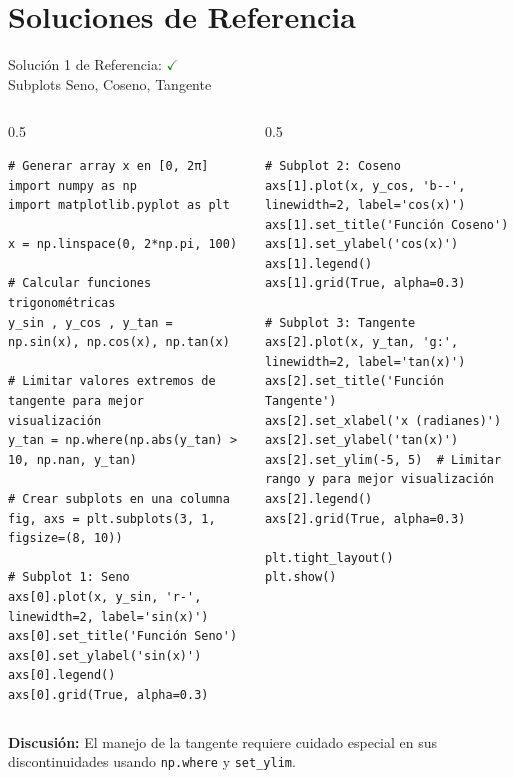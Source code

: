 \documentclass[10pt]{beamer}
\begin{document}
\section{Soluciones de Referencia}

\begin{frame}[fragile]{Solución 1 de Referencia: \hfill \textcolor{green}{$\checkmark$} \\ Subplots Seno, Coseno, Tangente}
\begin{columns}
\begin{column}{0.5\textwidth}
\begin{verbatim}
# Generar array x en [0, 2π]
import numpy as np
import matplotlib.pyplot as plt

x = np.linspace(0, 2*np.pi, 100)

# Calcular funciones trigonométricas
y_sin , y_cos , y_tan = np.sin(x), np.cos(x), np.tan(x)

# Limitar valores extremos de tangente para mejor visualización
y_tan = np.where(np.abs(y_tan) > 10, np.nan, y_tan)

# Crear subplots en una columna
fig, axs = plt.subplots(3, 1, figsize=(8, 10))

# Subplot 1: Seno
axs[0].plot(x, y_sin, 'r-', linewidth=2, label='sin(x)')
axs[0].set_title('Función Seno')
axs[0].set_ylabel('sin(x)')
axs[0].legend()
axs[0].grid(True, alpha=0.3)
\end{verbatim}
\end{column}
\begin{column}{0.5\textwidth}
\begin{verbatim}
# Subplot 2: Coseno
axs[1].plot(x, y_cos, 'b--', linewidth=2, label='cos(x)')
axs[1].set_title('Función Coseno')
axs[1].set_ylabel('cos(x)')
axs[1].legend()
axs[1].grid(True, alpha=0.3)

# Subplot 3: Tangente
axs[2].plot(x, y_tan, 'g:', linewidth=2, label='tan(x)')
axs[2].set_title('Función Tangente')
axs[2].set_xlabel('x (radianes)')
axs[2].set_ylabel('tan(x)')
axs[2].set_ylim(-5, 5)  # Limitar rango y para mejor visualización
axs[2].legend()
axs[2].grid(True, alpha=0.3)

plt.tight_layout()
plt.show()
\end{verbatim}
\end{column}
\end{columns}
\vspace{0.3cm}
\textbf{Discusión:} El manejo de la tangente requiere cuidado especial en sus discontinuidades usando \texttt{np.where} y \texttt{set\_ylim}.
\end{frame}
\end{document}
